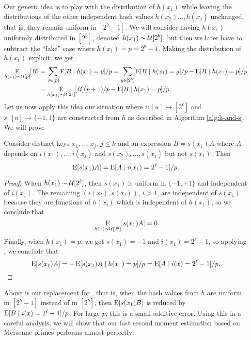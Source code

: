 Our generic idea is to play with the distribution of $h(x_1)$ while
leaving the distributions of the other independent hash values
$h(x_2)\ldots,h(x_j)$ unchanged, that is, they remain uniform in
$[2^b-1]$. We will consider having $h(x_1)$ uniformly distributed in
$[2^b]$, denoted $h(x_1) \sim \mathcal{U}[2^b]$, but then we later have to
subtract the ``fake'' case where $h(x_1)=p=2^b-1$.  Making the
distribution of $h(x_1)$ explicit, we get
\begin{equation}\begin{split}
  \operatorname*{E}_{h(x_1) \sim \mathcal{U}[p]}[B]&=\sum_{y\in[p]}\operatorname*{E}[B \mid h(x_1)=y]/p
  =\sum_{y\in[2^b]}\operatorname*{E}[B \mid h(x_1)=y]/p - \operatorname*{E}[B \mid h(x_1)=p]/p \\
  &=\operatorname*{E}_{h(x_1) \sim \mathcal{U}[2^b]}[B](p+1)/p - \operatorname*{E}[B \mid h(x_1)=p]/p.\label{eq:play-with-dist}
\end{split}\end{equation}
Let us now apply this idea our situation where $i:[u]\to[2^\ell]$ and
$s:[u]\to\{-1,1\}$ are constructed from $h$ as described in Algorithm
\ref{alg:h-and-s}. We will prove
\begin{lemma}\label{lem:remove-si}  Consider distinct keys $x_1,\ldots,x_j$, $j\leq k$ and an expression $B=s(x_1)A$ where $A$
   depends on $i(x_1),\ldots,i(x_j)$ and $s(x_2),\ldots,s(x_j)$ but not
   $s(x_1)$. Then
   \begin{equation}\label{eq:remove-si}
      \operatorname*{E}[s(x_1)A]=\operatorname*{E}[A\mid i(x_1)=2^\ell-1]/p.
   \end{equation}
\end{lemma}
\begin{proof}
When $h(x_1) \sim \mathcal{U}[2^b]$, then $s(x_1)$ is uniform
in $\{-1,+1\}$ and independent of $i(x_1)$. The remaining
$(i(x_i),s(x_i))$, $i>1$, are independent of $s(x_1)$ because they
are functions of $h(x_i)$ which is independent of $h(x_1)$, so
we conclude that 
\[\operatorname*{E}_{h(x) \sim \mathcal{U}[2^b]}[s(x_1)A]=0\]
Finally, when $h(x_1)=p$, we get $s(x_1)=-1$ and $i(x_1)=2^\ell-1$, 
so applying , we conclude
that 
\[\operatorname*{E}[s(x_1)A] = -\operatorname*{E}[s(x_1) A \mid h(x_1) = p]/p = \operatorname*{E}[A \mid i(x)=2^\ell-1]/p.\]
\end{proof}
Above  is our replacement for , that is,
when the hash values from $h$ are uniform in $[2^b-1]$ instead of
in $[2^b]$, then $\operatorname*{E}[s(x_1)B]$ is reduced by $\operatorname*{E}[B \mid i(x)=2^\ell-1]/p$.
For large $p$, this is a small additive error. Using this in a careful
analysis, we will show that our fast second moment estimation 
based on Mersenne primes performs almost perfectly:

